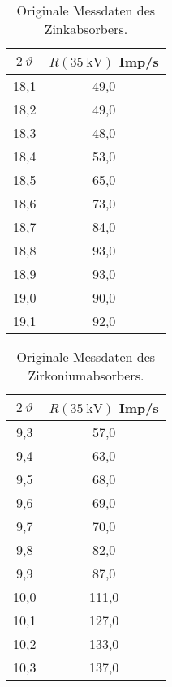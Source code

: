 \begin{table}[H]
    \caption{Originale Messdaten des Zinkabsorbers.}
    \centering
    \label{tab:origDaten5}
    \begin{tabular}{c c}
        \toprule
        $2~\vartheta$ & $R(\SI{35}{\kilo\volt})$ Imp/s \\
        \midrule
        18,1  &  49,0  \\
        18,2  &  49,0  \\
        18,3  &  48,0  \\
        18,4  &  53,0  \\
        18,5  &  65,0  \\
        18,6  &  73,0  \\
        18,7  &  84,0  \\
        18,8  &  93,0  \\
        18,9  &  93,0  \\
        19,0  &  90,0  \\
        19,1  &  92,0  \\
    \end{tabular}
\end{table}

\begin{table}[H]
    \caption{Originale Messdaten des Zirkoniumabsorbers.}
    \centering
    \label{tab:origDaten6}
    \begin{tabular}{c c}
        \toprule
        $2~\vartheta$ & $R(\SI{35}{\kilo\volt})$ Imp/s \\
        \midrule
        9,3  &  57,0  \\
        9,4  &  63,0  \\
        9,5  &  68,0  \\
        9,6  &  69,0  \\
        9,7  &  70,0  \\
        9,8  &  82,0  \\
        9,9  &  87,0  \\
        10,0  &  111,0  \\
        10,1  &  127,0  \\
        10,2  &  133,0  \\
        10,3  &  137,0  \\
    \end{tabular}
\end{table}